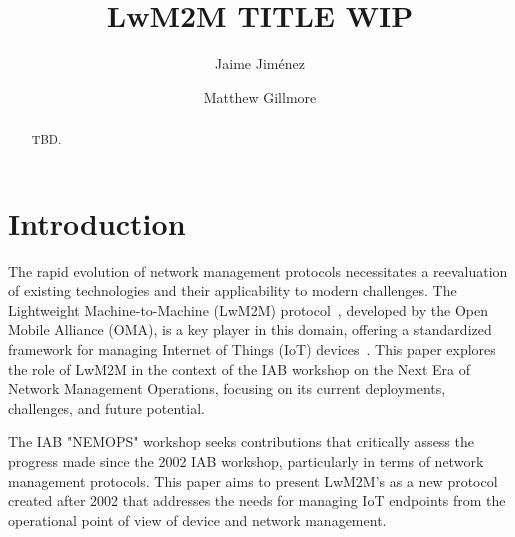 \documentclass[11pt,sigconf]{iabart}
\begin{document}
\title{LwM2M TITLE WIP}

\author{Jaime Jiménez}
\author{Matthew Gillmore}

\begin{abstract}
TBD.

\end{abstract}


\maketitle

\section{Introduction} \label{introduction}



The rapid evolution of network management protocols necessitates a reevaluation of existing technologies and their applicability to modern challenges. The Lightweight Machine-to-Machine (LwM2M) protocol~\cite{lwm2m-spec}, developed by the Open Mobile Alliance (OMA), is a key player in this domain, offering a standardized framework for managing Internet of Things (IoT) devices~\cite{oma-sdo}. This paper explores the role of LwM2M in the context of the IAB workshop on the Next Era of Network Management Operations, focusing on its current deployments, challenges, and future potential.

The IAB "NEMOPS" workshop seeks contributions that critically assess the progress made since the 2002 IAB workshop, particularly in terms of network management protocols. This paper aims to present LwM2M's as a new protocol created after 2002 that addresses the needs for managing IoT endpoints from the operational point of view of device and network management.
\end{document}
